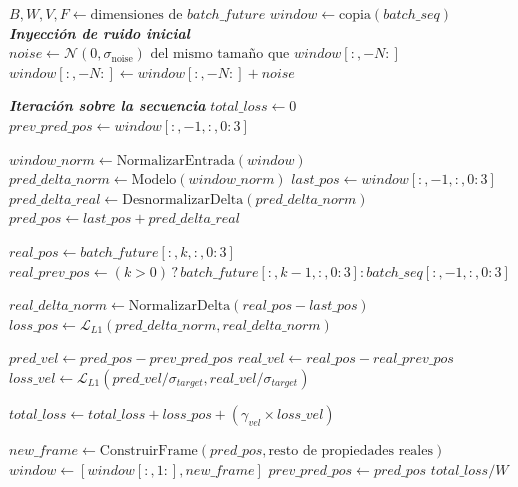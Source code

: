 \begin{algorithm}[H]
\caption{Función de \textit{Unrolling}}
\label{alg:run_rollout}
\begin{algorithmic}[1]
    \State $B, W, V, F \gets \text{dimensiones de } batch\_future$
    \State $window \gets \text{copia}(batch\_seq)$ 
    \State \textbf{\textit{Inyección de ruido inicial}}
    \State $noise \gets \mathcal{N}(0, \sigma_{\text{noise}}) \text{ del mismo tamaño que } window[:, -N:]$
    \State $window[:, -N:] \gets window[:, -N:] + noise$
    
    \State \textbf{\textit{Iteración sobre la secuencia}}
    \State $total\_loss \gets 0$
    \State $prev\_pred\_pos \gets window[:, -1, :, 0:3]$ 
        
        \State $window\_norm \gets \text{NormalizarEntrada}(window)$
        \State $ pred\_delta\_norm \gets \text{Modelo}(window\_norm)$         
        \State $ last\_pos \gets window[:, -1, :, 0:3]$
        \State $ pred\_delta\_real \gets \text{DesnormalizarDelta}(pred\_delta\_norm)$
        \State $ pred\_pos \gets last\_pos + pred\_delta\_real$ 
        
        \State $real\_pos \gets batch\_future[:, k, :, 0:3]$
        \State $real\_prev\_pos \gets (k > 0) \mathrel{?} batch\_future[:, k-1, :, 0:3] : batch\_seq[:, -1, :, 0:3]$
        
        \State $real\_delta\_norm \gets \text{NormalizarDelta}(real\_pos - last\_pos)$
        \State $loss\_pos \gets \mathcal{L}_{L1}(pred\_delta\_norm, real\_delta\_norm)$ 
        
        \State $pred\_vel \gets pred\_pos - prev\_pred\_pos$
        \State $real\_vel \gets real\_pos - real\_prev\_pos$
        \State $loss\_vel \gets \mathcal{L}_{L1}(pred\_vel / \sigma_{target}, real\_vel / \sigma_{target})$ 
        
        \State $total\_loss \gets total\_loss + loss\_pos + (\gamma_{vel} \times loss\_vel)$
        
        \State $new\_frame \gets \text{ConstruirFrame}(pred\_pos, \text{resto de propiedades reales})$
        \State $window \gets [window[:, 1:], new\_frame]$ 
        \State $prev\_pred\_pos \gets pred\_pos$
    \EndFor 
    \State \Return $total\_loss / W$
\EndFunction
\end{algorithmic}
\end{algorithm}

